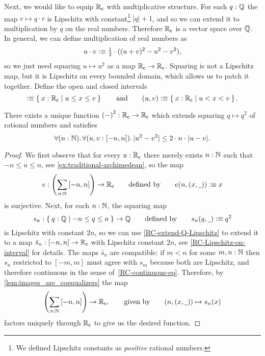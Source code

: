 Next, we would like to equip $\mathbb{R}_\mathsf{c}$ with multiplicative structure. For each $q : \mathbb{Q}$ the
map $r \mapsto q \cdot r$ is Lipschitz with constant\footnote{We defined Lipschitz
  constants as \emph{positive} rational numbers.} $|q| + 1$, and so we can extend it to
multiplication by $q$ on the real numbers. Therefore $\mathbb{R}_\mathsf{c}$ is a vector space over $\mathbb{Q}$.
In general, we can define multiplication of real numbers as
%
\begin{equation}
  u \cdot v \defeq
  {\textstyle \frac{1}{2}} \cdot ((u + v)^2 - u^2 - v^2),\label{mult-from-square}
\end{equation}
%
so we just need squaring $u \mapsto u^2$ as a map $\mathbb{R}_\mathsf{c} \to \mathbb{R}_\mathsf{c}$. Squaring is not a
Lipschitz map, but it is Lipschitz on every bounded domain, which allows us to patch it
together. Define the open and closed intervals
%
\begin{equation*}
  [u,v] \defeq \setof{ x : \RC | u \leq x \leq v }
  \qquad\text{and}\qquad
  (u,v) \defeq \setof{ x : \RC | u < x < v }.
\end{equation*}

\begin{thm} \label{RC-squaring}
  There exists a unique function ${(-)}^2 : \mathbb{R}_\mathsf{c} \to \mathbb{R}_\mathsf{c}$ which extends squaring $q \mapsto
  q^2$ of rational numbers and satisfies
  \begin{equation*}
    \fall{n : \N}
    \fall{u, v : [-n, n]}
    |u^2 - v^2| \leq 2 \cdot n \cdot |u - v|.
  \end{equation*}
\end{thm}

\begin{proof}
  We first observe that for every $u : \mathbb{R}_\mathsf{c}$ there merely exists $n : \mathbb{N}$ such that $-n
  \leq u \leq n$, see \autoref{ex:traditional-archimedean}, so the map
  \begin{equation*}
    e : \left(\sm{n : \N} [-n, n]\right) \to \RC
    \qquad\text{defined by}\qquad
    e(n, \pairr{x, \blank}) \defeq x
  \end{equation*}
  is surjective. Next, for each $n : \mathbb{N}$, the squaring map
  \begin{equation*}
    s_n : \setof{ q : \Q | -n \leq q \leq n } \to \Q
    \qquad\text{defined by}\qquad
    s_n(q, \blank) \defeq q^2
  \end{equation*}
  is Lipschitz with constant $2 n$, so we can use \autoref{RC-extend-Q-Lipschitz} to
  extend it to a map $\bar{s}_n : [-n, n] \to \mathbb{R}_\mathsf{c}$ with Lipschitz constant $2 n$, see
  \autoref{RC-Lipschitz-on-interval} for details. The maps $\bar{s}_n$ are compatible: if
  $m < n$ for some $m, n : \mathbb{N}$ then $s_n$ restricted to $[-m, m]$ must agree with $s_m$
  because both are Lipschitz, and therefore continuous in the sense
  of~\autoref{RC-continuous-eq}. Therefore, by \autoref{lem:images_are_coequalizers} the map
  \begin{equation*}
    \left(\sm{n : \N} [-n, n]\right) \to \RC,
    \qquad\text{given by}\qquad
    (n, \pairr{x, \blank}) \mapsto s_n(x)
  \end{equation*}
  factors uniquely through $\mathbb{R}_\mathsf{c}$ to give us the desired function.
\end{proof}

